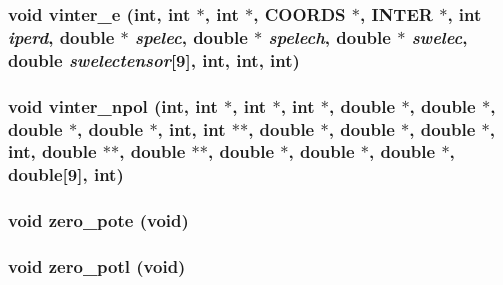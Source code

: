 \subsubsection{\setlength{\rightskip}{0pt plus 5cm}void vinter\_\-e (int, int $\ast$, int $\ast$, {\bf COORDS} $\ast$, {\bf INTER} $\ast$, int {\em iperd}, double $\ast$ {\em spelec}, double $\ast$ {\em spelech}, double $\ast$ {\em swelec}, double {\em swelectensor}[9], int, int, int)}\label{test_2dzug_2proto__energy_8h_f77c5471556a317879194322b0a63c9a}


\subsubsection{\setlength{\rightskip}{0pt plus 5cm}void vinter\_\-npol (int, int $\ast$, int $\ast$, int $\ast$, double $\ast$, double $\ast$, double $\ast$, double $\ast$, int, int $\ast$$\ast$, double $\ast$, double $\ast$, double $\ast$, int, double $\ast$$\ast$, double $\ast$$\ast$, double $\ast$, double $\ast$, double $\ast$, double[9], int)}\label{test_2dzug_2proto__energy_8h_0c074dbaa7da0323d093dd1982758a6d}


\subsubsection{\setlength{\rightskip}{0pt plus 5cm}void zero\_\-pote (void)}\label{test_2dzug_2proto__energy_8h_d8204917082dd0a8cf30e570067a6318}


\subsubsection{\setlength{\rightskip}{0pt plus 5cm}void zero\_\-potl (void)}\label{test_2dzug_2proto__energy_8h_8933e7a0229d4d9168448420a0e20dfc}


